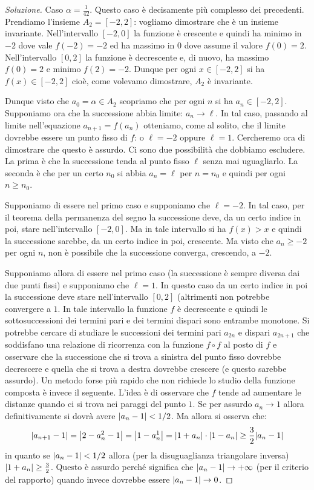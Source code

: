 \begin{proof}[Soluzione]
  Caso $\alpha = \frac 1{42}$. Questo caso è decisamente più complesso dei
  precedenti. Prendiamo l'insieme $A_2 = [-2, 2]$: vogliamo dimostrare
  che è un insieme invariante. Nell'intervallo $[-2,0]$ la funzione è
  crescente e quindi ha minimo in $-2$ dove vale $f(-2)=-2$ ed ha
  massimo in $0$ dove assume il valore $f(0) = 2$. Nell'intervallo
  $[0,2]$ la funzione è decrescente e, di nuovo, ha massimo $f(0)=2$ e
  minimo $f(2)=-2$. Dunque per ogni $x\in [-2,2]$ si ha $f(x) \in
  [-2,2]$ cioè, come volevamo dimostrare, $A_2$ è invariante.

  Dunque visto che $a_0 = \alpha \in A_2$ scopriamo che per ogni $n$
  si ha $a_n \in [-2,2]$. Supponiamo ora che la successione abbia
  limite: $a_n \to \ell$. In tal caso, passando al limite
  nell'equazione $a_{n+1} = f(a_n)$ otteniamo, come al solito, che il
  limite dovrebbe essere un punto fisso di $f$: o $\ell=-2$ oppure
  $\ell=1$. Cercheremo ora di dimostrare che questo è assurdo. Ci sono
  due possibilità che dobbiamo escludere. La prima è che la
  successione tenda al punto fisso $\ell$ senza mai uguagliarlo. La
  seconda è che per un certo $n_0$ si abbia $a_n = \ell$ per $n=n_0$ e
  quindi per ogni $n\ge n_0$.

  Supponiamo di essere nel primo caso e supponiamo che $\ell = -2$. In
  tal caso, per il teorema della permanenza del segno la successione
  deve, da un certo indice in poi, stare nell'intervallo $[-2, 0]$. Ma
  in tale intervallo si ha $f(x)>x$ e quindi la successione sarebbe,
  da un certo indice in poi, crescente. Ma visto che $a_n \ge -2$ per
  ogni $n$, non è possibile che la successione converga, crescendo, a
  $-2$.

  Supponiamo allora di essere nel primo caso (la successione è sempre
  diversa dai due punti fissi) e supponiamo che $\ell = 1$. In
  questo caso da un certo indice in poi la successione deve stare
  nell'intervallo $[0,2]$ (altrimenti non potrebbe convergere a
  $1$. In tale intervallo la funzione $f$ è decrescente e quindi
  le sottosuccessioni dei termini pari e dei termini dispari sono
  entrambe monotone. Si potrebbe cercare di studiare le successioni dei
  termini pari $a_{2n}$ e dispari $a_{2n+1}$ che soddisfano una relazione di ricorrenza
  con la funzione $f\circ f$ al posto di $f$ e osservare che la successione
  che si trova a sinistra del punto fisso dovrebbe decrescere e quella che si trova a
  destra dovrebbe crescere (e questo sarebbe assurdo). Un metodo forse più
  rapido che non richiede lo studio della funzione composta è invece il seguente.
  L'idea è di osservare che $f$ tende ad aumentare le distanze quando ci si trova
  nei paraggi del punto $1$. Se per assurdo $a_n\to 1$ allora definitivamente
  si dovrà avere ${\left|a_n-1\right|}< 1/2$. Ma allora si osserva che:
  \[
    {\left|a_{n+1}-1\right|}
    = {\left|2-a_n^2-1\right|}={\left|1-a_n^1\right|}
    = {\left|1+a_n\right|}\cdot {\left|1-a_n\right|}
    \ge \frac 3 2 {\left|a_n-1\right|}
  \]
  in quanto se ${\left|a_n-1\right|}<1/2$ allora (per la disuguaglianza triangolare inversa)
  ${\left|1+a_n\right|}\ge \frac 3 2$. Questo è assurdo perché significa che ${\left|a_n -1\right|}\to +\infty$
  (per il criterio del rapporto) quando invece dovrebbe essere ${\left|a_n-1\right|}\to 0$.


\end{proof}
